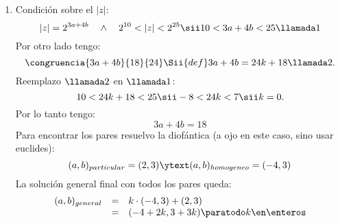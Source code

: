\begin{enumerate}[label=\alph*)]
  \item
        Condición sobre el $|z|$:
        $$
          |z| = 2^{3a+4b}
          \quad\land\quad
          2^{10} < |z| < 2 ^{25}
          \sii
          10 < 3a+4b < 25 \llamada1
        $$
        Por otro lado tengo:
        $$
          \congruencia{3a + 4b}{18}{24}
          \Sii{def}
          3a + 4b = 24k + 18 \llamada2.
        $$
        Reemplazo $\llamada2$ en $\llamada1$:
        $$
          10 < 24k + 18 < 25
          \sii
          -8 < 24k < 7
          \sii
          k = 0.
        $$
        Por lo tanto tengo:
        $$
          3a + 4b = 18
        $$
        Para encontrar los pares resuelvo la diofántica {\tiny (a ojo en este caso, sino usar euclides)}:
        $$
          (a,b)_{particular} = (2,3) \ytext (a,b)_{homogeneo} = (-4,3)
        $$
        La solución general final con todos los pares queda:
        $$
          \begin{array}{rcl}
            (a,b)_{general} & = & k\cdot (-4,3) +  (2,3)                     \\
                            & = & (-4 + 2k, 3 + 3k) \paratodo k \en \enteros
          \end{array}
        $$
\end{enumerate}

\begin{aportes}
  \item {}
\end{aportes}
